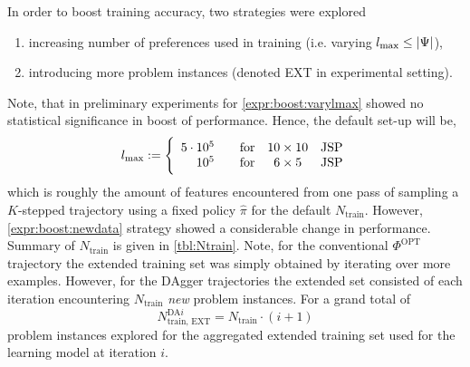 In order to boost training accuracy, two strategies were explored 
\begin{enumerate}[after={{}}, leftmargin=*,
    label={\textbf{Boost.\arabic*}}, ref={{Boost.\arabic*}}]
    \item \label{expr:boost:varylmax} increasing number of preferences used 
    in training (i.e. varying \mbox{$l_{\max} \leq \lvert\Psi\rvert$}),
    \item \label{expr:boost:newdata} introducing more problem instances 
    (denoted 
    EXT in experimental setting).
\end{enumerate}
Note, that in preliminary experiments for \ref{expr:boost:varylmax} showed no 
statistical significance in boost of performance. Hence, the default set-up 
will be, 
\begin{equation}
l_{\max} := \Bigg \{ \begin{array}{rccc} 
5 \cdot 10^5 & \quad\text{for} & 10\times 10 & \text{JSP} \\
10^5 & \quad\text{for} & 6\times 5 & \text{JSP}
\end{array}
\end{equation}
which is roughly the amount of features encountered from one pass of sampling a 
\mbox{$K$-stepped} trajectory using a fixed policy $\hat{\pi}$ for the 
default $N_{\text{train}}$.
However, \ref{expr:boost:newdata} strategy showed a considerable change in 
performance. Summary of $N_{\text{train}}$ is given in \cref{tbl:Ntrain}. 
Note, for the conventional $\Phi^{\text{OPT}}$ trajectory the extended training 
set was simply obtained by iterating over more examples. 
However, for the DAgger trajectories the extended set consisted of each 
iteration encountering $N_{\text{train}}$ \emph{new} problem 
instances. For a grand total of 
\begin{equation}
N^{\text{DA}i}_{\text{train, EXT}}=N_{\text{train}}\cdot (i+1) 
\end{equation}
problem instances explored for the aggregated extended training set used for 
the learning model at iteration $i$.




